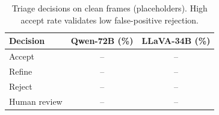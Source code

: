 \begin{table}[h]
\centering
\caption{Triage decisions on clean frames (placeholders). High accept rate validates low false-positive rejection.}
\label{tab:clean_fpr}
\begin{tabular}{lcc}
\toprule
\textbf{Decision} & \textbf{Qwen-72B (\%)} & \textbf{LLaVA-34B (\%)} \\
\midrule
Accept       & -- & -- \\
Refine       & -- & -- \\
Reject       & -- & -- \\
Human review & -- & -- \\
\bottomrule
\end{tabular}
\end{table}
